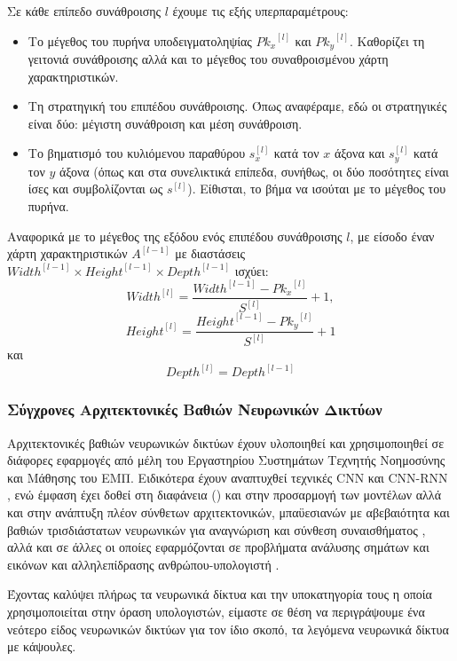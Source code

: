 Σε κάθε επίπεδο συνάθροισης $l$ έχουμε τις εξής υπερπαραμέτρους:
\begin{itemize}
  \item Το μέγεθος του πυρήνα υποδειγματοληψίας ${Pk_x}^{[l]}$ και ${Pk_y}^{[l]}$. Καθορίζει τη γειτονιά συνάθροισης αλλά και το μέγεθος του συναθροισμένου χάρτη χαρακτηριστικών.
  \item Τη στρατηγική του επιπέδου συνάθροισης. Όπως αναφέραμε, εδώ οι στρατηγικές είναι δύο: μέγιστη συνάθροιση και μέση συνάθροιση.
  \item Το βηματισμό του κυλιόμενου παραθύρου $s^{[l]}_x$ κατά τον $x$ άξονα και $s^{[l]}_y$ κατά τον $y$ άξονα (όπως και στα συνελικτικά επίπεδα, συνήθως, οι δύο ποσότητες είναι ίσες και συμβολίζονται ως $s^{[l]}$). Είθισται, το βήμα να ισούται με το μέγεθος του πυρήνα.
\end{itemize}

Αναφορικά με το μέγεθος της εξόδου ενός επιπέδου συνάθροισης $l$, με είσοδο έναν χάρτη χαρακτηριστικών $A^{[l-1]}$ με διαστάσεις ${Width}^{[l-1]} \times {Height}^{[l-1]}\times{Depth}^{[l-1]}$ ισχύει:
\begin{equation}
  {Width}^{[l]}= \frac{{Width}^{[l-1]}-{Pk_x}^{[l]}}{S^{[l]}} + 1,
  \end{equation}
  \begin{equation}
    {Height}^{[l]}=\frac{{Height}^{[l-1]}-{Pk_y}^{[l]}}{S^{[l]}} + 1
  \end{equation}
  και
  \begin{equation}
    {Depth}^{[l]}={Depth}^{[l-1]}
  \end{equation}


\subsubsection{Σύγχρονες Αρχιτεκτονικές Βαθιών Νευρωνικών Δικτύων}

Αρχιτεκτονικές βαθιών νευρωνικών δικτύων έχουν υλοποιηθεί και  χρησιμοποιηθεί σε διάφορες εφαρμογές από μέλη του Εργαστηρίου Συστημάτων Τεχνητής Νοημοσύνης και Μάθησης  του ΕΜΠ. Ειδικότερα έχουν αναπτυχθεί τεχνικές CNN και CNN-RNN \cite{kollias2018deep,kol2019predicting,arsenos2022large}, ενώ έμφαση έχει δοθεί στη διαφάνεια () και στην προσαρμογή των μοντέλων \cite{kollias2017adaptation,kollias2020deep5,kollias2020transparent} αλλά και στην ανάπτυξη πλέον σύνθετων αρχιτεκτονικών, μπαϋεσιανών  με αβεβαιότητα και βαθιών τρισδιάστατων νευρωνικών για αναγνώριση και σύνθεση συναισθήματος \cite{de2020deep,psaroudakis2022mixaugment,refsk10,kollias2020va,caridakis10synthesizing}, αλλά και σε άλλες οι οποίες εφαρμόζονται σε προβλήματα ανάλυσης σημάτων και εικόνων και αλληλεπίδρασης ανθρώπου-υπολογιστή \cite{alhnaity2021autoencoder,mylonas2009using,kollias1991unified,tzouveli2008adaptive}. 
\par
Έχοντας καλύψει πλήρως τα νευρωνικά δίκτυα και την υποκατηγορία τους η οποία χρησιμοποιείται στην όραση υπολογιστών, είμαστε σε θέση να περιγράψουμε ένα νεότερο είδος νευρωνικών δικτύων για τον ίδιο σκοπό, τα λεγόμενα νευρωνικά δίκτυα με κάψουλες.

